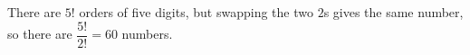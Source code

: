 There are $5!$ orders of five digits, but swapping the two $2$s gives the same number, so there are $\dfrac{5!}{2!}=\boxed{60}$ numbers.
